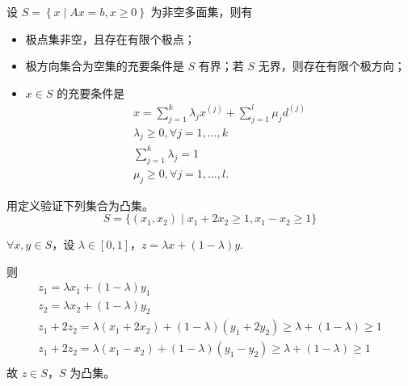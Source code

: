 \begin{theorem}[多面集表示定理]
    设 $S = \left\{x \mid Ax = b, x \ge 0\right\}$ 为非空多面集，则有
    \begin{itemize}
        \item 极点集非空，且存在有限个极点；
        \item 极方向集合为空集的充要条件是 $S$ 有界；若 $S$ 无界，则存在有限个极方向；
        \item $x \in S$ 的充要条件是 \begin{gather*}
            x = \sum_{j = 1}^k \lambda_j x^{(j)} + \sum_{j = 1}^l \mu_j d^{(j)}\\
            \lambda_j \ge 0, \forall j = 1, \dots, k\\
            \sum_{j = 1}^k \lambda_j = 1\\
            \mu_j \ge 0, \forall j = 1, \dots, l \text{.}
        \end{gather*}
    \end{itemize}
\end{theorem}

\begin{example}
    用定义验证下列集合为凸集。
    \[S = \{(x_1, x_2) \mid x_1 + 2x_2 \ge 1, x_1 - x_2 \ge 1\}\]

    \answer $\forall x, y \in S$，设 $\lambda \in [0, 1]$，$z = \lambda x + (1 - \lambda)y$.

    则
    \begin{gather*}
        z_1 = \lambda x_1 + (1 - \lambda)y_1\\
        z_2 = \lambda x_2 + (1 - \lambda)y_2\\
        z_1 + 2z_2 = \lambda(x_1 + 2x_2) + (1 - \lambda)(y_1 + 2y_2) \ge \lambda + (1 - \lambda) \ge 1\\
        z_1 + 2z_2 = \lambda(x_1 - x_2) + (1 - \lambda)(y_1 - y_2) \ge \lambda + (1 - \lambda) \ge 1\\
    \end{gather*}
    故 $z \in S$，$S$ 为凸集。
\end{example}


